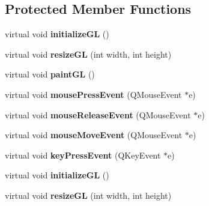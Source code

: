 \subsection*{Protected Member Functions}
\begin{DoxyCompactItemize}
\item 
\mbox{\label{class_rendering_widget_a23fc14e1efb73c7554dab2910d202df4}} 
virtual void {\bfseries initialize\+GL} ()
\item 
\mbox{\label{class_rendering_widget_a172887c34056621b080132a22968e2d0}} 
virtual void {\bfseries resize\+GL} (int width, int height)
\item 
\mbox{\label{class_rendering_widget_ac46988ceac0da61f5c34eb74cfe8cffd}} 
virtual void {\bfseries paint\+GL} ()
\item 
\mbox{\label{class_rendering_widget_a756b7f7e5238b8af3749ab4ff4cbcd24}} 
virtual void {\bfseries mouse\+Press\+Event} (Q\+Mouse\+Event $\ast$e)
\item 
\mbox{\label{class_rendering_widget_ae28626ca2e37ed2241b9de91cae37e47}} 
virtual void {\bfseries mouse\+Release\+Event} (Q\+Mouse\+Event $\ast$e)
\item 
\mbox{\label{class_rendering_widget_a94579e1e2304bc9dd719c5a7a5051b6a}} 
virtual void {\bfseries mouse\+Move\+Event} (Q\+Mouse\+Event $\ast$e)
\item 
\mbox{\label{class_rendering_widget_ad194bf76d6cb2e8e76334641037831cc}} 
virtual void {\bfseries key\+Press\+Event} (Q\+Key\+Event $\ast$e)
\item 
\mbox{\label{class_rendering_widget_ae4d61f514029c7cb70d62b12795ca1dc}} 
virtual void {\bfseries initialize\+GL} ()
\item 
\mbox{\label{class_rendering_widget_a5c02d61ecd03c106ed76aac8813f5a6d}} 
virtual void {\bfseries resize\+GL} (int width, int height)
\item 
\mbox{\label{class_rendering_widget_aff402531584d6fcd6a8bcc07dfb07361}} 

\end{DoxyCompactItemize}
